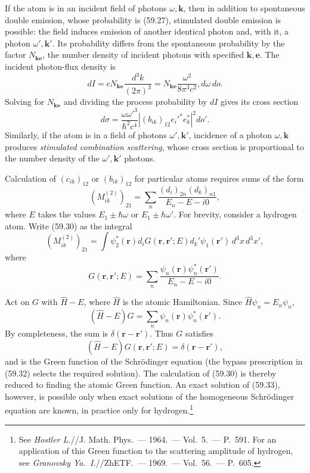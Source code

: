 If the atom is in an incident field of photons $\omega,\mathbf k$, then in addition to spontaneous double emission, whose probability is (59.27), stimulated double emission is possible: the field induces emission of another identical photon and, with it, a photon $\omega',\mathbf k'$. Its probability differs from the spontaneous probability by the factor $N_{\mathbf k\mathbf e}$, the number density of incident photons with specified $\mathbf k,\mathbf e$. The incident photon-flux density is
\[
dI=cN_{\mathbf k\mathbf e}\frac{d^3k}{(2\pi)^3}
=N_{\mathbf k\mathbf e}\frac{\omega^2}{8\pi^3c^2},d\omega\,do.
\]
Solving for $N_{\mathbf k\mathbf e}$ and dividing the process probability by $dI$ gives its cross section
\begin{equation}
d\sigma=\frac{\omega\omega'^3}{\hbar^2c^4}\left|(b_{ik})_{12}e_i'^*e_k^*\right|^2do'.
\tag{59.29}
\end{equation}
Similarly, if the atom is in a field of photons $\omega',\mathbf k'$, incidence of a photon $\omega,\mathbf k$ produces \emph{stimulated combination scattering}, whose cross section is proportional to the number density of the $\omega',\mathbf k'$ photons.

Calculation of $(c_{ik})_{12}$ or $(b_{ik})_{12}$ for particular atoms requires sums of the form
\begin{equation}
(M_{ik}^{(2)})_{21}=\sum_n\frac{(d_i)_{2n}(d_k)_{n1}}{E_n-E-i0},
\tag{59.30}
\end{equation}
where $E$ takes the values $E_1\pm\hbar\omega$ or $E_1\pm\hbar\omega'$. For brevity, consider a hydrogen atom. Write (59.30) as the integral
\begin{equation}
(M_{ik}^{(2)})_{21}=\int\psi_2^*(\mathbf r)d_iG(\mathbf r,\mathbf r';E)d_k'\psi_1(\mathbf r')\,d^3x\,d^3x',
\tag{59.31}
\end{equation}
where
\begin{equation}
G(\mathbf r,\mathbf r';E)=\sum_n\frac{\psi_n(\mathbf r)\psi_n^*(\mathbf r')}{E_n-E-i0}.
\tag{59.32}
\end{equation}

Act on $G$ with $\widehat H-E$, where $\widehat H$ is the atomic Hamiltonian. Since $\widehat H\psi_n=E_n\psi_n$,
\[
(\widehat H-E)G=\sum_n\psi_n(\mathbf r)\psi_n^*(\mathbf r').
\]
By completeness, the sum is $\delta(\mathbf r-\mathbf r')$. Thus $G$ satisfies
\begin{equation}
(\widehat H-E)G(\mathbf r,\mathbf r';E)=\delta(\mathbf r-\mathbf r'),
\tag{59.33}
\end{equation}
and is the Green function of the Schrödinger equation (the bypass prescription in (59.32) selects the required solution). The calculation of (59.30) is thereby reduced to finding the atomic Green function. An exact solution of (59.33), however, is possible only when exact solutions of the homogeneous Schrödinger equation are known, in practice only for hydrogen.\footnote{See \emph{Hostler L.}//J. Math. Phys.~--- 1964.~--- Vol.~5.~--- P.~591. For an application of this Green function to the scattering amplitude of hydrogen, see \emph{Granovsky Ya.~I.}//ZhETF.~--- 1969.~--- Vol.~56.~--- P.~605.}

